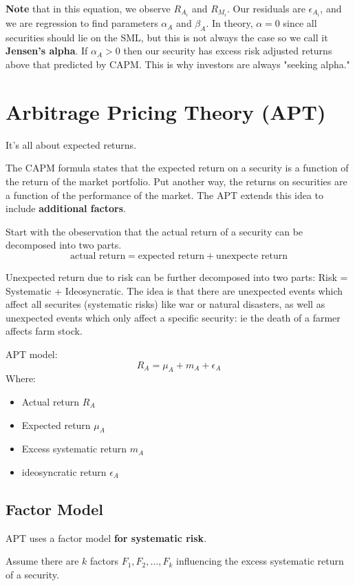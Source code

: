 \documentclass{article}
\begin{document}
\textbf{Note} that in this equation, we observe $R_{A_i}$ and $R_{M_i}$. Our residuals are $\epsilon_{A_i}$, and we are regression to find parameters $\alpha_A$ and $\beta_A$. In theory, $\alpha=0$ since all securities should lie on the SML, but this is not always the case so we call it \textbf{Jensen's alpha}. If $\alpha_A > 0$ then our security has excess risk adjusted returns above that predicted by CAPM. This is why investors are always "seeking alpha."

\section{Arbitrage Pricing Theory (APT)}
It's all about expected returns. 

The CAPM formula states that the expected return on a security is a function of the return of the market portfolio. Put another way, the returns on securities are a function of the performance of the market. The APT extends this idea to include \textbf{additional factors}. 

Start with the obeservation that the actual return of a security can be decomposed into two parts. 
\[ \text{actual return} = \text{expected return} +\text{unexpecte return}\]

Unexpected return due to risk can be further decomposed into two parts:
Risk = Systematic  + Ideosyncratic.
The idea is that there are unexpected events which affect all securites (systematic risks) like war or natural disasters, as well as unexpected events which only affect a specific security: ie the death of a farmer affects  farm stock.

APT model:
\[ R_A = \mu_A + m_A + \epsilon_A\]
Where:
\begin{itemize}
\item Actual return $R_A$
\item Expected return $\mu_A$
\item Excess systematic return $m_A$
\item ideosyncratic return $\epsilon_A$
\end{itemize}

\subsection{Factor Model}
APT uses a factor model \textbf{for systematic risk}. 

Assume there are $k$ factors $F_1, F_2, \dots, F_k$ influencing the excess systematic return of a security.
\end{document}
